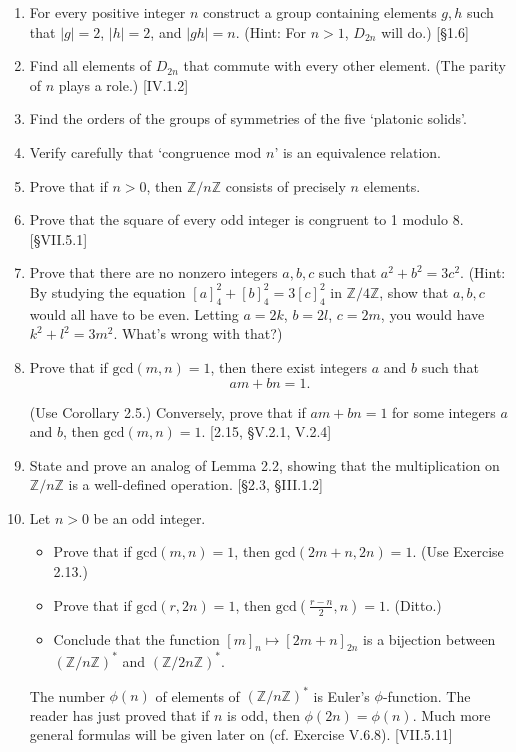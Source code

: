 \begin{enumerate}
    \item For every positive integer $n$ construct a group containing elements $g, h$ such that $|g|=2$, $|h|=2$, and $|gh|=n$. (Hint: For $n > 1$, $D_{2n}$ will do.) [\S1.6]

    \item Find all elements of $D_{2n}$ that commute with every other element. (The parity of $n$ plays a role.) [IV.1.2]

    \item Find the orders of the groups of symmetries of the five `platonic solids'.

    \item Verify carefully that `congruence mod $n$' is an equivalence relation.

    \item Prove that if $n > 0$, then $\mathbb{Z}/n\mathbb{Z}$ consists of precisely $n$ elements.

    \item Prove that the square of every odd integer is congruent to 1 modulo 8. [\S VII.5.1]

    \item Prove that there are no nonzero integers $a, b, c$ such that $a^2+b^2=3c^2$. (Hint: By studying the equation $[a]^2_4 + [b]^2_4 = 3 [c]^2_4$ in $\mathbb{Z}/4\mathbb{Z}$, show that $a,b,c$ would all have to be even. Letting $a=2k$, $b=2l$, $c=2m$, you would have $k^2+l^2=3m^2$. What's wrong with that?)

    \item Prove that if $\text{gcd}(m, n)=1$, then there exist integers $a$ and $b$ such that \[am + bn = 1.\]

          (Use Corollary 2.5.) Conversely, prove that if $am+bn=1$ for some integers $a$ and $b$, then $\text{gcd}(m, n)=1$. [2.15, \S V.2.1, V.2.4]

    \item State and prove an analog of Lemma 2.2, showing that the multiplication on $\mathbb{Z}/n\mathbb{Z}$ is a well-defined operation. [\S2.3, \S III.1.2]

    \item Let $n > 0$ be an odd integer.
          \begin{itemize}
              \item Prove that if $\text{gcd}(m, n)=1$, then $\text{gcd}(2m+n, 2n)=1$. (Use Exercise 2.13.)
              \item Prove that if $\text{gcd}(r, 2n)=1$, then $\text{gcd}(\frac{r-n}{2}, n)=1$. (Ditto.)
              \item Conclude that the function $[m]_n \mapsto [{2m+n}]_{2n}$ is a bijection between $(\mathbb{Z}/n\mathbb{Z})^*$ and $(\mathbb{Z}/2n\mathbb{Z})^*$.
          \end{itemize}
          The number $\phi(n)$ of elements of $(\mathbb{Z}/n\mathbb{Z})^*$ is Euler's $\phi$-function. The reader has just proved that if $n$ is odd, then $\phi(2n) = \phi(n)$. Much more general formulas will be given later on (cf. Exercise V.6.8). [VII.5.11]


\end{enumerate}
